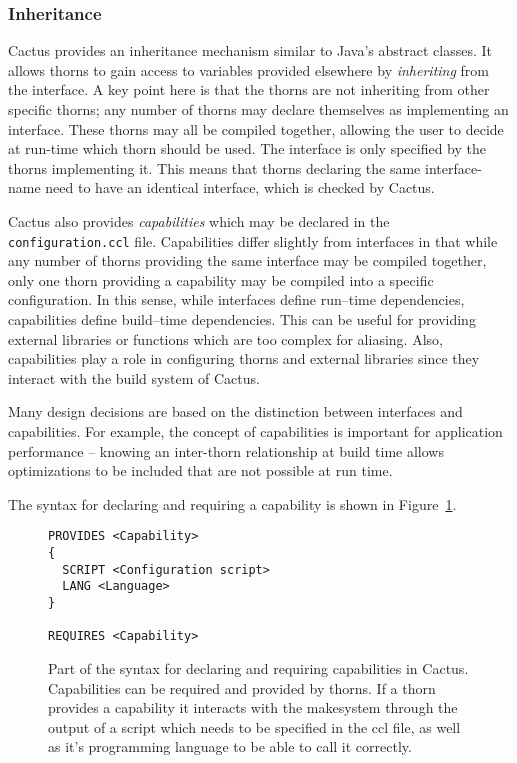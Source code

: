 \documentclass[conference]{IEEEtran}
\begin{document}
\subsubsection{Inheritance}
Cactus provides an inheritance mechanism similar to Java's abstract classes. It allows thorns
to gain access to variables provided elsewhere by \emph{inheriting} from the interface. A key point here
is that the thorns are not inheriting from other specific thorns; any number of thorns may declare
themselves as implementing an interface. These thorns may all be
compiled together, allowing the user to decide at run-time which thorn should be used.
The interface is only specified by the thorns implementing it. This means
that thorns declaring the same interface-name need to have an identical interface,
which is checked by Cactus.

Cactus also provides \emph{capabilities} which may be declared in the \texttt{configuration.ccl} file.
Capabilities differ slightly from interfaces in that while any number of thorns providing the
same interface may be compiled together, only one thorn providing a capability may be
compiled into a specific configuration. In this sense, while interfaces define run--time
dependencies, capabilities define build--time dependencies.
This can be useful for providing external libraries or 
functions which are too complex for aliasing. Also, capabilities play a role in 
configuring thorns and external libraries since they interact with the build system of Cactus.

Many design decisions are based on the distinction between interfaces and capabilities.
For example,  the 
concept of capabilities is important for application performance
-- knowing an inter-thorn relationship at build time allows
optimizations to be included that are not possible at run time.  

The syntax for declaring and requiring a capability is shown in
Figure~\ref{cactus_capability_provides}.

\begin{figure}[h]
\centering
{\small
\begin{Verbatim}[frame=single, framerule=0.3mm]
PROVIDES <Capability> 
{
  SCRIPT <Configuration script> 
  LANG <Language> 
}

REQUIRES <Capability>
\end{Verbatim}
}
\caption{Part of the syntax for declaring and requiring capabilities in Cactus. Capabilities can be
required and provided by thorns. If a thorn provides a capability it interacts with the makesystem
through the output of a script which needs to be specified in the ccl file, as well as it's
programming language to be able to call it correctly.}
\label{cactus_capability_provides}
\end{figure}
\end{document}
